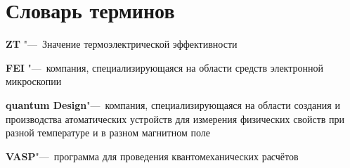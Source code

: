 \chapter*{Словарь терминов}             %

\textbf{ZT} "---~Значение термоэлектрической эффективности

\textbf{FEI} "---~компания, специализирующаяся на области средств электронной микроскопии

\textbf{quantum Design}"---~компания, специализирующаяся на области создания и производства атоматических устройств для измерения физических свойств при разной температуре и в разном магнитном поле

\textbf{VASP}"---~программа для проведения квантомеханических расчётов 